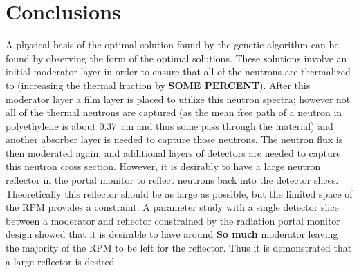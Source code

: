 \section{Conclusions}

A physical basis of the optimal solution found by the genetic algorithm can be found by observing the form of the optimal solutions.
These solutions involve an initial moderator layer in order to ensure that all of the neutrons are thermalized to (increasing the thermal fraction by \textbf{SOME PERCENT}).
After this moderator layer a film layer is placed to utilize this neutron spectra; however not all of the thermal neutrons are captured (as the mean free path of a neutron in polyethylene is about \SI{0.37}{\cm} and thus some pass through the material) and another absorber layer is needed to capture those neutrons.  
The neutron flux is then moderated again, and additional layers of detectors are needed to capture this neutron cross section.
However, it is desirably to have a large neutron reflector in the portal monitor to reflect neutrons back into the detector slices. 
Theoretically this reflector should be as large as possible, but the limited space of the RPM provides a constraint.
A parameter study with a single detector slice between a moderator and reflector constrained by the radiation portal monitor design showed that it is desirable to have around \textbf{So much} moderator leaving the majority of the RPM to be left for the reflector.
Thus it is demonstrated that a large reflector is desired.
